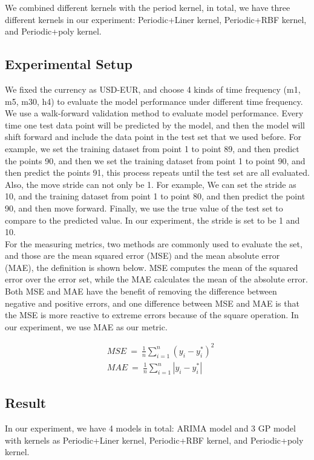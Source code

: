 \documentclass[12pt]{article}
\begin{document}
We combined different kernels with the period kernel, in total, we have three different kernels in our experiment: Periodic+Liner kernel, Periodic+RBF kernel, and Periodic+poly kernel.


\subsection{Experimental Setup}
We fixed the currency as USD-EUR, and choose 4 kinds of time frequency (m1, m5, m30, h4) to evaluate the model performance under different time frequency. \\

We use a walk-forward validation method to evaluate model performance. Every time one test data point will be predicted by the model, and then the model will shift forward and include the data point in the test set that we used before. For example, we set the training dataset from point 1 to point 89, and then predict the points 90, and then we set the training dataset from point 1 to point 90, and then predict the points 91, this process repeats until the test set are all evaluated. Also, the move stride can not only be 1. For example, We can set the stride as 10, and the training dataset from point 1 to point 80, and then predict the point 90, and then move forward. Finally, we use the true value of the test set to compare to the predicted value. In our experiment, the stride is set to be 1 and 10. \\

For the measuring metrics, two methods are commonly used to evaluate the set, and those are the mean squared error (MSE) and the mean absolute error (MAE), the definition is shown below. MSE computes the mean of the squared error over the error set, while the MAE calculates the mean of the absolute error.  Both MSE and MAE have the benefit of removing the difference between negative and positive errors, and one difference between MSE and MAE is that the MSE is more reactive to extreme errors because of the square operation. In our experiment, we use MAE as our metric.

 \begin{align*}
&MSE\ =\ \frac{1}{n}\sum ^{n}_{i=1}\left( y_{i} -y^{*}_{i}\right)^{2}\\
&MAE\ =\ \frac{1}{n}\sum ^{n}_{i=1} |y_{i} -y^{*}_{i} |
 \end{align*}
 
\subsection{Result}
In our experiment, we have 4 models in total: ARIMA model and 3 GP model with kernels as Periodic+Liner kernel, Periodic+RBF kernel, and Periodic+poly kernel.\\
\end{document}
